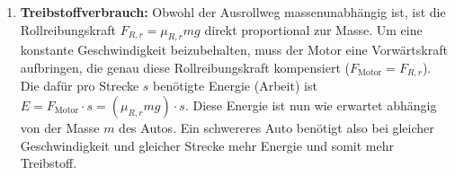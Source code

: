 \documentclass[ngerman]{scrreprt}
\newenvironment{loesungbox}[1]
  {\needspace{5\baselineskip}\begin{loesungboxstyle}[frametitle={#1}]}
  {\end{loesungboxstyle}}
\begin{document}
\begin{loesungbox}{Lösung zu \Cref{aufg:rollreibung}}
\begin{enumerate}
\begin{enumerate}
        \item \textbf{Numerischer Wert:} Zuerst rechnen wir die Geschwindigkeit um: $v_0 = \SI{70}{\kilo\meter\per\hour} = \frac{70}{3.6} \si{\meter\per\second} \approx \SI{19.44}{\meter\per\second}$.
        \begin{equation}
            x_W = \frac{(\SI{19.44}{\meter\per\second})^2}{2 \cdot \num{0.013} \cdot \SI{9.81}{\meter\per\second\squared}} \approx \SI{1482}{\meter}
        \end{equation}
    \end{enumerate}
    
    \item \textbf{Treibstoffverbrauch:}
    Obwohl der Ausrollweg massenunabhängig ist, ist die Rollreibungskraft $F_{R,r} = \mu_{R,r} m g$ direkt proportional zur Masse. Um eine konstante Geschwindigkeit beizubehalten, muss der Motor eine Vorwärtskraft aufbringen, die genau diese Rollreibungskraft kompensiert ($F_{\text{Motor}} = F_{R,r}$). Die dafür pro Strecke $s$ benötigte Energie (Arbeit) ist $E = F_{\text{Motor}} \cdot s = (\mu_{R,r} m g) \cdot s$. Diese Energie ist nun wie erwartet abhängig von der Masse $m$ des Autos. Ein schwereres Auto benötigt also bei gleicher Geschwindigkeit und gleicher Strecke mehr Energie und somit mehr Treibstoff. 
\end{enumerate}
\end{loesungbox}
\end{document}
